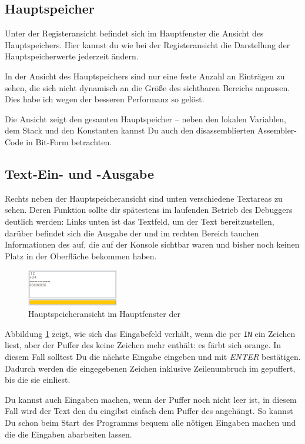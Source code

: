 \subsection{Hauptspeicher}
Unter der Registeransicht befindet sich im Hauptfenster die Ansicht des Hauptspeichers. Hier kannst du wie bei der Registeransicht die Darstellung der Hauptspeicherwerte jederzeit ändern.

In der Ansicht des Hauptspeichers sind nur eine feste Anzahl an Einträgen zu sehen, die sich nicht dynamisch an die Größe des sichtbaren Bereichs anpassen. Dies habe ich wegen der besseren Performanz so gelöst.

Die Ansicht zeigt den gesamten Hauptspeicher -- neben den lokalen Variablen, dem Stack und den Konstanten kannst Du auch den disassemblierten Assembler-Code in Bit-Form betrachten.

\subsection{Text-Ein- und -Ausgabe}
Rechts neben der Hauptspeicheransicht sind unten verschiedene Textareas zu sehen. Deren Funktion sollte dir spätestens im laufenden Betrieb des Debuggers deutlich werden: Links unten ist das Textfeld, um der \mic{} Text bereitzustellen, darüber befindet sich die Ausgabe der \mic{} und im rechten Bereich tauchen Informationen des \md{} auf, die auf der Konsole sichtbar waren und bisher noch keinen Platz in der Oberfläche bekommen haben.

\begin{figure}[h]
	\centering
	\includegraphics[width=4cm]{images/main-frame-mic-ta}
	\caption{Hauptspeicheransicht im Hauptfenster der \mdg{}}
	\label{fig:main-frame-mic-ta}
\end{figure}

Abbildung \ref{fig:main-frame-mic-ta} zeigt, wie sich das Eingabefeld verhält, wenn die \mic{} per \texttt{IN} ein Zeichen liest, aber der Puffer des \md{} keine Zeichen mehr enthält: es färbt sich orange. In diesem Fall solltest Du die nächste Eingabe eingeben und mit \emph{ENTER} bestätigen. Dadurch werden die eingegebenen Zeichen inklusive Zeilenumbruch im \md{} gepuffert, bis die \mic{} sie einliest.

Du kannst auch Eingaben machen, wenn der Puffer noch nicht leer ist, in diesem Fall wird der Text den du eingibst einfach dem Puffer des \md{} angehängt. So kannst Du schon beim Start des Programms bequem alle nötigen Eingaben machen und die \mdg{} die Eingaben abarbeiten lassen.

